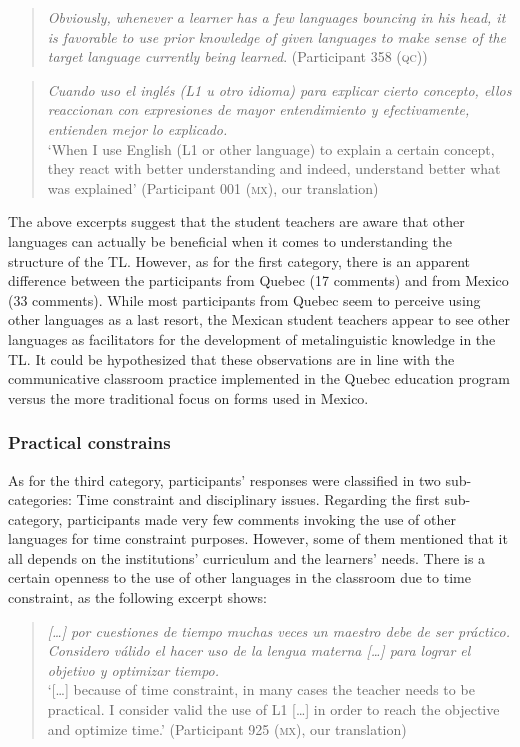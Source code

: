 \documentclass[output=paper]{../langscibook}
\begin{document}
\begin{quote}
\emph{Obviously, whenever a learner has a few languages bouncing in his head, it is favorable to use prior knowledge of given languages to make sense of the target language currently being learned}. (Participant 358 (\textsc{qc}))
\end{quote}

\begin{quote}
\emph{Cuando uso el inglés (L1 u otro idioma) para explicar cierto concepto, ellos reaccionan con expresiones de mayor entendimiento y efectivamente, entienden mejor lo explicado.}\smallskip\\
`When I use English (L1 or other language) to explain a certain concept, they react with better understanding and indeed, understand better what was explained' (Participant 001 (\textsc{mx}), our translation)
\end{quote}

The above excerpts suggest that the student teachers are aware that other languages can actually be beneficial when it comes to understanding the structure of the TL. However, as for the first category, there is an apparent difference between the participants from Quebec (17 comments) and from Mexico (33 comments). While most participants from Quebec seem to perceive using other languages as a last resort, the Mexican student teachers appear to see other languages as facilitators for the development of metalinguistic knowledge in the TL. It could be hypothesized that these observations are in line with the communicative classroom practice implemented in the Quebec education program versus the more traditional focus on forms used in Mexico.


\subsubsection{Practical constrains}


As for the third category, participants’ responses were classified in two sub-categories: Time constraint and disciplinary issues. Regarding the first sub-cat\-e\-go\-ry, participants made very few comments invoking the use of other languages for time constraint purposes. However, some of them mentioned that it all depends on the institutions’ curriculum and the learners’ needs. There is a certain openness to the use of other languages in the classroom due to time constraint, as the following excerpt shows:

\begin{quote}
\emph{[…] por cuestiones de tiempo muchas veces un maestro debe de ser práctico. Considero válido el hacer uso de la lengua materna […] para lograr el objetivo y optimizar tiempo.}\smallskip\\
`[…] because of time constraint, in many cases the teacher needs to be practical. I consider valid the use of L1 […] in order to reach the objective and optimize time.' (Participant 925 (\textsc{mx}), our translation)
\end{quote}
\end{document}
